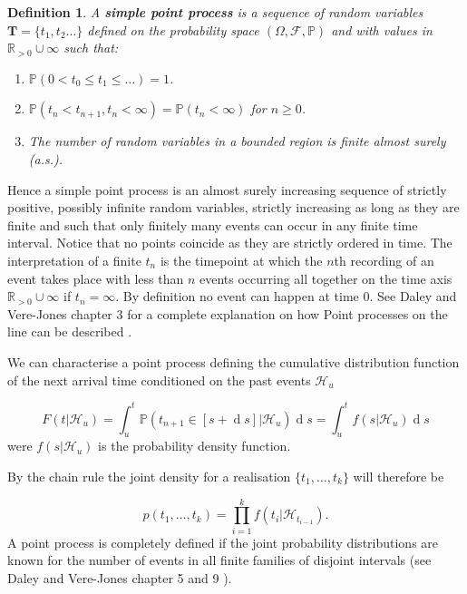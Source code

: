 \documentclass[11pt,a4paper]{article}
\renewcommand{\d}[1]{\ensuremath{\operatorname{d}\!{#1}}}
\renewcommand{\vec}[1]{\mathbf{#1}}
\newtheorem{definition}{Definition}[section]
\begin{document}
\begin{definition}
    A \textbf{simple point process} is a sequence of random variables $\vec{T} = \{ t_1, t_2 \dots \}$ defined on the probability space $(\Omega, \mathcal{F}, \mathbb{P})$ and with values in $\mathbb{R}_{>0} \cup \infty$ such that:
    \begin{enumerate}[label=(\roman*)]
        \item $\mathbb{P}(0 < t_0 \leq t_1 \leq \dots) = 1$.
        \item $\mathbb{P}(t_n < t_{n+1}, t_n < \infty) = \mathbb{P}(t_n < \infty)$ for $n \geq 0$.
        \item The number of random variables in a bounded region is finite almost surely (a.s.).
    \end{enumerate}
\end{definition}

Hence a simple point process is an almost surely increasing sequence of strictly positive, possibly infinite random variables, strictly increasing as long as they are finite and such that only finitely many events can occur in any finite time interval. Notice that no points coincide as they are strictly ordered in time.
The interpretation of a finite $t_n$ is the timepoint at which the $n$th recording of an event takes place with less than $n$ events occurring all together on the time axis $\mathbb{R}_{>0} \cup \infty$ if $t_n = \infty$. By definition no event can happen at time $0$. See Daley and Vere-Jones chapter 3 for a complete explanation on how Point processes on the line can be described \cite{Daley}.

We can characterise a point process defining the cumulative distribution function of the next arrival time conditioned on the past events $\mathcal{H}_u$

\begin{equation} \label{eq:CumDistPointProc}
    F(t|\mathcal{H}_u) = \int_u^t \mathbb{P}(t_{n+1} \in [s+\d s] | \mathcal{H}_u) \d s = \int_u^t f(s | \mathcal{H}_u) \d s
\end{equation}
were $f(s | \mathcal{H}_u)$ is the probability density function.

By the chain rule the joint density for a realisation $\{ t_1, \dots, t_k\}$ will therefore be

\begin{equation}\label{eq:JointDensHawkes}
    p(t_1, \dots, t_k) = \prod_{i=1}^k f(t_i | \mathcal{H}_{t_{i-1}}).
\end{equation}
A point process is completely defined if the joint probability distributions are known for the number of events in all finite families of disjoint intervals (see Daley and Vere-Jones chapter 5 and 9 \cite{Daley}).
\end{document}

